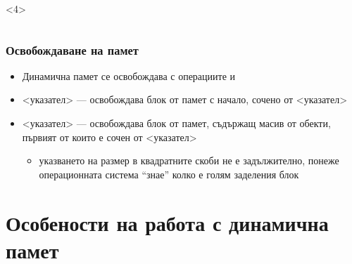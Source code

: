 \documentclass[alsotrans]{beamerswitch}
\begin{document}
\begin{frame}[fragile]
\begin{columns}[T,onlytextwidth]
\begin{column}{.52\textwidth}
\begin{overlayarea}{\textwidth}{38ex}
        \begin{onlyenv}<4>
        \end{onlyenv}
      \end{overlayarea}
  \end{column}
  \end{columns}
\end{frame}

\begin{frame}
  \frametitle{Освобождаване на памет}

  \begin{itemize}[<+->]
  \item Динамична памет се освобождава с операциите  и 
  \item {} <указател> --- освобождава блок от памет с начало, сочено от <указател>
  \item {} <указател> --- освобождава блок от памет, съдържащ масив от обекти, първият от които е сочен от <указател>
    \begin{itemize}
    \item указването на размер в квадратните скоби не е задължително, понеже операционната система ``знае'' колко е голям заделения блок
    \end{itemize}
  \end{itemize}
\end{frame}

\section{Особености на работа с динамична памет}
\end{document}
